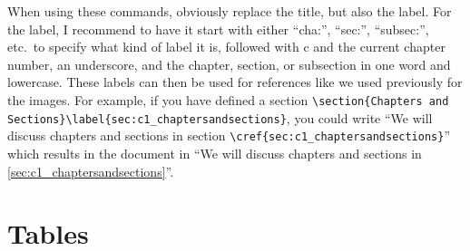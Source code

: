 When using these commands, obviously replace the title, but also the label. For
the label, I recommend to have it start with either ``cha:'', ``sec:'', ``subsec:'', etc.\ to specify what kind of label it is, followed with c and the current chapter number, an underscore, and the chapter, section, or subsection in one word and lowercase. These labels can then be used for references like we used previously for the images. For example, if you have defined a section
\lstinline[language=Tex]!\section{Chapters and Sections}\label{sec:c1_chaptersandsections}!, 
you could write ``We will discuss chapters
and sections in section
\lstinline[language=Tex]!\cref{sec:c1_chaptersandsections}!'' which results in the document in ``We will discuss chapters and sections in \cref{sec:c1_chaptersandsections}''.


\section{Tables}\label{sec:c1_tables}

